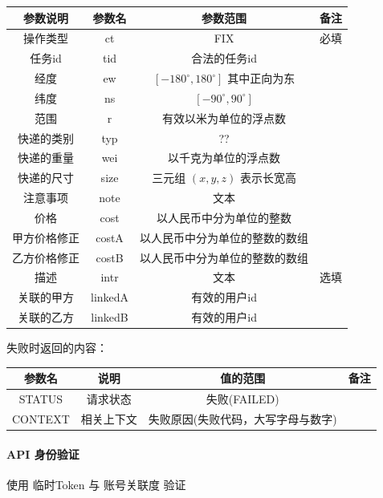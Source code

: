 \documentclass[UTF8]{article}
\def\apiauth{\paragraph{\colorbox[rgb]{0.45,0.9,1}{API 身份验证}}} %
\def\失败{\colorbox[rgb]{1,0.5,0.5}{失败}}
\def\失败V{失败(FAILED)}
\def\失败原因{失败原因(失败代码，大写字母与数字)}
\begin{document}
    \begin{tabular}{|c|c|c|c|}
        \hline \rule[-2ex]{0pt}{5.5ex} 参数说明 & 参数名 & 参数范围 & 备注 \\        \hline \rule[-2ex]{0pt}{5.5ex} 操作类型 & ct & FIX & 必填 \\
        \hline \rule[-2ex]{0pt}{5.5ex} 任务id & tid & 合法的任务id &  \\
        \hline \rule[-2ex]{0pt}{5.5ex} 经度 & ew & $[-180^\circ,180^\circ]$ 其中正向为东 &  \\
        \hline \rule[-2ex]{0pt}{5.5ex} 纬度 & ns & $[-90^\circ,90^\circ]$ &  \\
        \hline \rule[-2ex]{0pt}{5.5ex} 范围 & r & 有效以米为单位的浮点数 &  \\
        \hline \rule[-2ex]{0pt}{5.5ex} 快递的类别 & typ & ?? & \\
        \hline \rule[-2ex]{0pt}{5.5ex} 快递的重量 & wei & 以千克为单位的浮点数 &  \\
        \hline \rule[-2ex]{0pt}{5.5ex} 快递的尺寸 & size & 三元组 $(x,y,z)$ 表示长宽高 &  \\
        \hline \rule[-2ex]{0pt}{5.5ex} 注意事项 & note & 文本 &  \\
        \hline \rule[-2ex]{0pt}{5.5ex} 价格 & cost & 以人民币中分为单位的整数 &  \\
        \hline \rule[-2ex]{0pt}{5.5ex} 甲方价格修正 & costA & 以人民币中分为单位的整数的数组 &  \\
        \hline \rule[-2ex]{0pt}{5.5ex} 乙方价格修正 & costB & 以人民币中分为单位的整数的数组 &  \\
        \hline \rule[-2ex]{0pt}{5.5ex} 描述 & intr & 文本 & 选填 \\
        \hline \rule[-2ex]{0pt}{5.5ex} 关联的甲方 & linkedA & 有效的用户id &  \\
        \hline \rule[-2ex]{0pt}{5.5ex} 关联的乙方 & linkedB & 有效的用户id &  \\
        \hline 
    \end{tabular} 
    \par \失败 时返回的内容：\\
    \begin{tabular}{|c|c|c|c|}
        \hline \rule[-2ex]{0pt}{5.5ex} 参数名 & 说明 & 值的范围 & 备注 \\
        \hline \rule[-2ex]{0pt}{5.5ex} STATUS & 请求状态 & \失败V &  \\ 
        \hline \rule[-2ex]{0pt}{5.5ex} CONTEXT & 相关上下文 & \失败原因 &  \\
        \hline 
    \end{tabular}
    \apiauth
    使用 临时Token 与 账号关联度 验证
\end{document}
